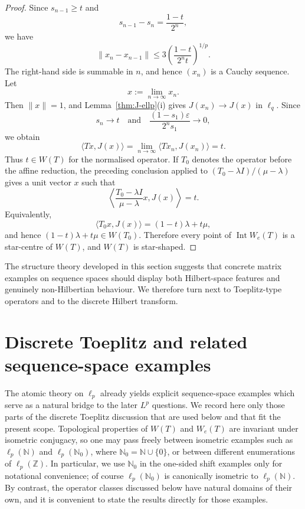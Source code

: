 \documentclass[11pt]{amsart}
\numberwithin{equation}{section}
\theoremstyle{definition}
\theoremstyle{remark}
\begin{document}
\begin{proof}
Since \(s_{n-1}\ge t\) and
\[
        s_{n-1}-s_n=\frac{1-t}{2^n},
\]
we have
\[
        \|x_n-x_{n-1}\|
        \le
        3\left(\frac{1-t}{2^n t}\right)^{1/p}.
\]
The right-hand side is summable in \(n\), and hence \((x_n)\) is a Cauchy
sequence. Let
\[
        x:=\lim_{n\to\infty}x_n .
\]
Then \(\|x\|=1\), and Lemma~\ref{thm:J-ellp}(i) gives \(J(x_n)\to J(x)\) in \(\ell_q\).
Since
\[
        s_n\to t
        \quad\text{and}\quad
        \frac{(1-s_1)\varepsilon}{2^n s_1}\to0,
\]
we obtain
\[
        \langle Tx,J(x)\rangle
        =
        \lim_{n\to\infty}\langle Tx_n,J(x_n)\rangle
        =
        t.
\]
Thus \(t\in W(T)\) for the normalised operator. If \(T_0\) denotes the
operator before the affine reduction, the preceding conclusion applied to
\((T_0-\lambda I)/(\mu-\lambda)\) gives a unit vector \(x\) such that
\[
        \left\langle
        \frac{T_0-\lambda I}{\mu-\lambda}x,J(x)
        \right\rangle=t.
\]
Equivalently,
\[
        \langle T_0x,J(x)\rangle=(1-t)\lambda+t\mu,
\]
and hence \((1-t)\lambda+t\mu\in W(T_0)\).
Therefore every point of \(\operatorname{Int}W_e(T)\) is a star-centre of
\(W(T)\), and \(W(T)\) is star-shaped.
\end{proof}


The structure theory developed in this section suggests that concrete matrix examples on sequence spaces should display both Hilbert-space features and genuinely non-Hilbertian behaviour. We therefore turn next to Toeplitz-type operators and to the discrete Hilbert transform.

\section{Discrete Toeplitz and related sequence-space examples}\label{secexamp}

The atomic theory on $\ell_p$ already yields explicit sequence-space examples which serve as a natural bridge to the later $L^p$ questions. We record here only those parts of the discrete Toeplitz discussion that are used below and that fit the present scope. Topological properties of $W(T)$ and $W_e(T)$ are invariant under isometric conjugacy, so one may pass freely between isometric examples such as $\ell_p(\mathbb N)$ and $\ell_p(\mathbb N_0)$, where $\mathbb N_0=\mathbb N \cup \{0\}$, or between different enumerations of $\ell_p(\mathbb Z)$.
In particular, we use \(\mathbb N_0\) in the one-sided shift examples only for
notational convenience; of course \(\ell_p(\mathbb N_0)\) is canonically
isometric to \(\ell_p(\mathbb N)\).
 By contrast, the operator classes discussed below have natural domains of their own, and it is convenient to state the results directly for those examples.
\end{document}
